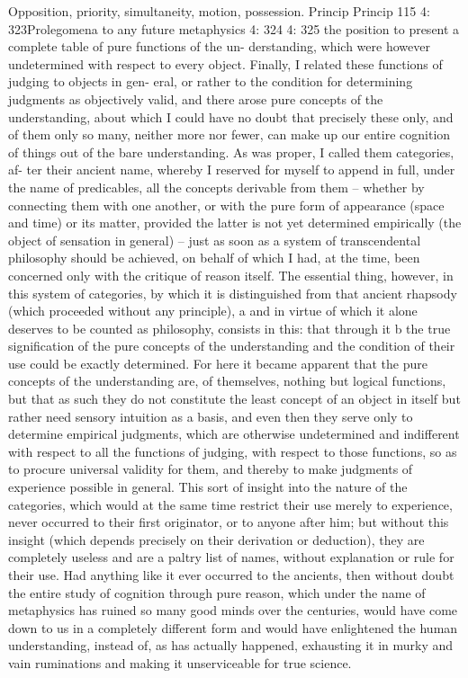 Opposition, priority, simultaneity, motion, possession.
Princip
Princip
115
4: 323Prolegomena to any future metaphysics
4: 324
4: 325
the position to present a complete table of pure functions of the un-
derstanding, which were however undetermined with respect to every
object. Finally, I related these functions of judging to objects in gen-
eral, or rather to the condition for determining judgments as objectively
valid, and there arose pure concepts of the understanding, about which I
could have no doubt that precisely these only, and of them only so many,
neither more nor fewer, can make up our entire cognition of things out
of the bare understanding. As was proper, I called them categories, af-
ter their ancient name, whereby I reserved for myself to append in full,
under the name of predicables, all the concepts derivable from them –
whether by connecting them with one another, or with the pure form of
appearance (space and time) or its matter, provided the latter is not yet
determined empirically (the object of sensation in general) – just as soon
as a system of transcendental philosophy should be achieved, on behalf of
which I had, at the time, been concerned only with the critique of reason
itself.
The essential thing, however, in this system of categories, by which
it is distinguished from that ancient rhapsody (which proceeded without
any principle), a and in virtue of which it alone deserves to be counted
as philosophy, consists in this: that through it b the true signiﬁcation of
the pure concepts of the understanding and the condition of their use
could be exactly determined. For here it became apparent that the pure
concepts of the understanding are, of themselves, nothing but logical
functions, but that as such they do not constitute the least concept of an
object in itself but rather need sensory intuition as a basis, and even then
they serve only to determine empirical judgments, which are otherwise
undetermined and indifferent with respect to all the functions of judging,
with respect to those functions, so as to procure universal validity for
them, and thereby to make judgments of experience possible in general.
This sort of insight into the nature of the categories, which would
at the same time restrict their use merely to experience, never occurred
to their ﬁrst originator, or to anyone after him; but without this insight
(which depends precisely on their derivation or deduction), they are
completely useless and are a paltry list of names, without explanation
or rule for their use. Had anything like it ever occurred to the ancients,
then without doubt the entire study of cognition through pure reason,
which under the name of metaphysics has ruined so many good minds
over the centuries, would have come down to us in a completely different
form and would have enlightened the human understanding, instead of,
as has actually happened, exhausting it in murky and vain ruminations
and making it unserviceable for true science.

